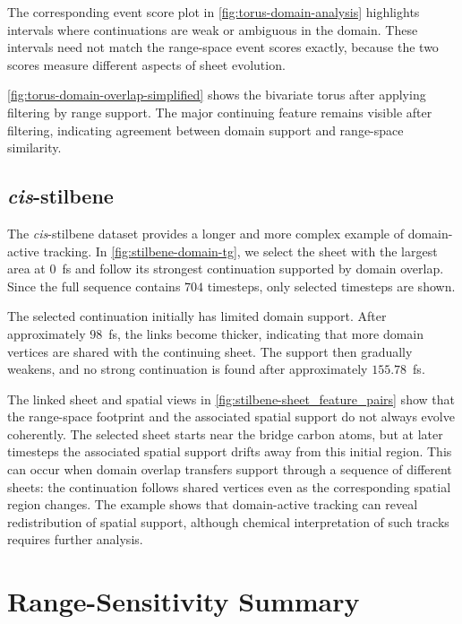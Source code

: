 \documentclass[review]{vgtc}
\begin{document}
The corresponding event score plot in \autoref{fig:torus-domain-analysis} highlights intervals where continuations are weak or ambiguous in the domain. These intervals need not match the range-space event scores exactly, because the two scores measure different aspects of sheet evolution.

\autoref{fig:torus-domain-overlap-simplified} shows the bivariate torus after applying filtering by range support. The major continuing feature remains visible after filtering, indicating agreement between domain support and range-space similarity.



\subsection{\textit{cis}-stilbene}

The \textit{cis}-stilbene dataset provides a longer and more complex example of domain-active tracking. In \autoref{fig:stilbene-domain-tg}, we select the sheet with the largest area at $0$~fs and follow its strongest continuation supported by domain overlap. Since the full sequence contains $704$ timesteps, only selected timesteps are shown.

The selected continuation initially has limited domain support. After approximately $98$~fs, the links become thicker, indicating that more domain vertices are shared with the continuing sheet. The support then gradually weakens, and no strong continuation is found after approximately $155.78$~fs.

The linked sheet and spatial views in \autoref{fig:stilbene-sheet_feature_pairs} show that the range-space footprint and the associated spatial support do not always evolve coherently. The selected sheet starts near the bridge carbon atoms, but at later timesteps the associated spatial support drifts away from this initial region. This can occur when domain overlap transfers support through a sequence of different sheets: the continuation follows shared vertices even as the corresponding spatial region changes. The example shows that domain-active tracking can reveal redistribution of spatial support, although chemical interpretation of such tracks requires further analysis.









\section{Range-Sensitivity Summary}
\label{sec:supp-range-sensitivity}
\end{document}

